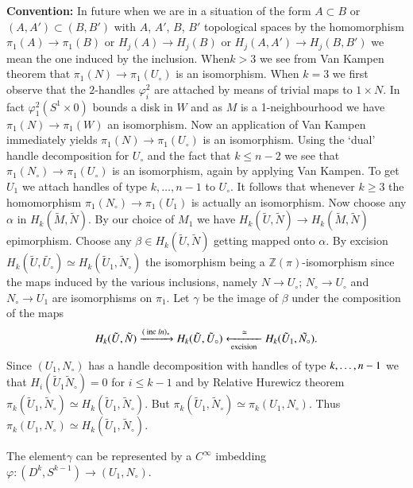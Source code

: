 \medskip
\noindent\textbf{Convention:} 
In future when we are in a situation of the form
$A \subset B$ or $(A, A') \subset (B, B') $ with $A$, $A'$, $B$, $B'$
topological spaces by the homomorphism $\pi_1 (A) \to \pi_1(B)$ or
$H_j (A) \to H_j (B) $ or $H_j(A, A')\to H_j(B, B')$ we mean the one
induced by the inclusion. When\pageoriginale $k>3$ we see from Van
Kampen theorem 
that $\pi_1(N) \to \pi_1 (U_\circ)$ is an isomorphism. When $k = 3$ we
first observe that the $2$-handles $\varphi^2_i$ are attached by means
of trivial maps to $1 \times N$. In fact $ \varphi^2_1 (S^1 \times 0)$
bounds a disk in $W$ and as $M$ is a 1-neighbourhood we have $\pi_1
(N) \to \pi_1 (W)$ an isomorphism. Now an application of Van Kampen
immediately yields $\pi_1 (N) \to \pi_1 (U_\circ)$ is an
isomorphism. Using the `dual' handle decomposition for $U_\circ$ and the
fact that $k \leq n-2$ we see that $\pi_1 (N_\circ) \to \pi_1 (U_\circ)$ is an
isomorphism, again by applying Van Kampen. To get $U_1$ we attach
handles of type $ k, \ldots, n-1$ to $U_\circ$. It follows that whenever
$k \geq 3$ the homomorphism $\pi_1 (N_\circ) \to \pi_1(U_1)$ is actually
an isomorphism. Now choose any $\alpha$ in $H_k (\tilde{M},
\tilde{N})$. By our choice of $M_1$ we have $H_k (\tilde{U},
\tilde{N}) \to H_k (\tilde{M}, \tilde{N})$ epimorphism. Choose any
$\beta \in H_k (\tilde{U}, \tilde{N})$ getting mapped onto
$\alpha$. By excision $H_k (\tilde{U}, \tilde{U_\circ}) \simeq H_k
(\tilde{U}_1, \tilde{N}_\circ)$ the isomorphism being a $\mathbb{Z}
(\pi)$-isomorphism since the maps induced by the various inclusions,
namely $N \to U_\circ$; $N_\circ \to U_\circ$ and $N_\circ \to U_1$ are isomorphisms
on $\pi_1$. Let $\gamma$ be the image of $\beta$ under the composition
of the maps 
$$ 
H_k (\tilde{U}, \tilde{N}) \xrightarrow{(\text{ inc } ln)_*} H_k 
(\tilde{U}, \tilde{U}_\circ)
\underset{\text{excision}}{\xleftarrow{\hspace{0.4cm}\simeq\hspace{0.4cm}}} 
 H_k  
(\tilde{U}_1, \tilde{N_\circ}). 
$$
Since $(U_1, N_\circ)$ has a handle decomposition with handles of type $k,
\ldots,\break n-1$ we that $H_i (\tilde{U}_1 \tilde{N}_\circ) = 0$ for $i \leq
k-1$ and by Relative Hurewicz theorem $ \pi_k (\tilde{U}_1,
\tilde{N}_\circ) \simeq  H_k (\tilde{U}_1, \tilde{N}_\circ)$. But $\pi_k
(\tilde{U}_1, \tilde{N}_\circ)  \simeq \pi_k (U_1, N_\circ)$. Thus $\pi_k (U_1,
N_\circ)\simeq H_k (\tilde{U}_1, \tilde{N}_\circ)$. 

\medskip
{}
 The element\pageoriginale $\gamma$ can be represented
by a $C^\infty$ imbedding $\varphi: (D^k, S^{k-1}) \to (U_1, N_\circ)$.   

